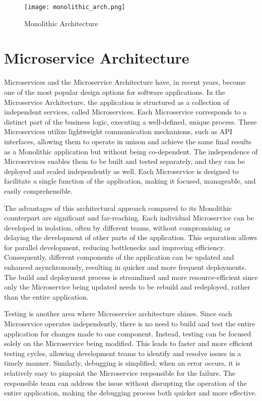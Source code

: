 \begin{figure}[!h]
    \graphicspath{ {./diagrams/} }
    \texttt{[image: monolithic\_arch.png]}
    \centering
    \caption{Monolithic Architecture}
    \label{fig:mono_arch}
\end{figure}

\section{Microservice Architecture}

Microservices and the Microservice Architecture have, in recent years, become one of the most popular design options for software applications. In the Microservice Architecture, the application is structured as a collection of independent services, called Microservices. Each Microservice corresponds to a distinct part of the business logic, executing a well-defined, unique process\cite{monovsmicro}\cite{microservicesdef}. These Microservices utilize lightweight communication mechanisms, such as API interfaces, allowing them to operate in unison and achieve the same final results as a Monolithic application but without being co-dependent. The independence of Microservices enables them to be built and tested separately, and they can be deployed and scaled independently as well. Each Microservice is designed to facilitate a single function of the application, making it focused, manageable, and easily comprehensible\cite{chandrinos_thesis}.

The advantages of this architectural approach compared to its Monolithic counterpart are significant and far-reaching. Each individual Microservice can be developed in isolation, often by different teams, without compromising or delaying the development of other parts of the application. This separation allows for parallel development, reducing bottlenecks and improving efficiency. Consequently, different components of the application can be updated and enhanced asynchronously, resulting in quicker and more frequent deployments. The build and deployment process is streamlined and more resource-efficient since only the Microservice being updated needs to be rebuild and redeployed, rather than the entire application.

Testing is another area where Microservice architecture shines. Since each Microservice operates independently, there is no need to build and test the entire application for changes made to one component. Instead, testing can be focused solely on the Microservice being modified. This leads to faster and more efficient testing cycles, allowing development teams to identify and resolve issues in a timely manner. Similarly, debugging is simplified; when an error occurs, it is relatively easy to pinpoint the Microservice responsible for the failure. The responsible team can address the issue without disrupting the operation of the entire application, making the debugging process both quicker and more effective.

